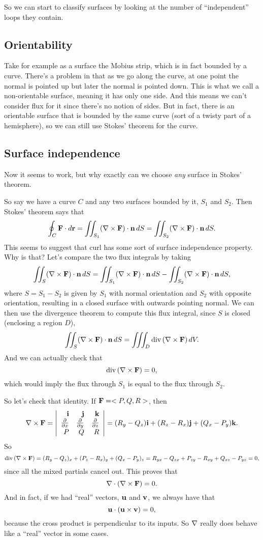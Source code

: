 So we can start to classify surfaces by looking at the number of ``independent'' loops they contain.

\subsection{Orientability}

Take for example as a surface the Mobius strip, which is in fact bounded by a curve. There's a problem in that as we go along the curve, at one point the normal is pointed up but later the normal is pointed down. This is what we call a non-orientable surface, meaning it has only one side. And this means we can't consider flux for it since there's no notion of sides. But in fact, there is an orientable surface that is bounded by the same curve (sort of a twisty part of a hemisphere), so we can still use Stokes' theorem for the curve.

\subsection{Surface independence}
Now it seems to work, but why exactly can we choose \textit{any} surface in Stokes' theorem. 

So say we have a curve $C$ and any two surfaces bounded by it, $S_1$ and $S_2$. Then Stokes' theorem says that
\[ \oint_C \boldsymbol{\mathbf{F}} \cdot d\boldsymbol{\mathbf{r}} = \iint_{S_1} (\nabla \times \boldsymbol{\mathbf{F}}) \cdot \boldsymbol{\mathbf{n}} \, dS = \iint_{S_2} (\nabla \times \boldsymbol{\mathbf{F}}) \cdot \boldsymbol{\mathbf{n}} \, dS.\]
This seems to suggest that curl has some sort of surface independence property. Why is that? Let's compare the two flux integrals by taking
\[ \iint_{S} (\nabla \times \boldsymbol{\mathbf{F}}) \cdot \boldsymbol{\mathbf{n}} \,dS= \iint_{S_1} (\nabla \times \boldsymbol{\mathbf{F}}) \cdot \boldsymbol{\mathbf{n}} \, dS - \iint_{S_2} (\nabla \times \boldsymbol{\mathbf{F}}) \cdot \boldsymbol{\mathbf{n}} \, dS, \]
where $S = S_1 - S_2$ is given by $S_1$ with normal orientation and $S_2$ with opposite orientation, resulting in a closed surface with outwards pointing normal. We can then use the divergence theorem to compute this flux integral, since $S$ is closed (enclosing a region $D$),
\[  \iint_{S} (\nabla \times \boldsymbol{\mathbf{F}}) \cdot \boldsymbol{\mathbf{n}} \, dS = \iiint_D \mathrm{div}\,(\nabla \times \boldsymbol{\mathbf{F}}) \, dV. \]
And we can actually check that
\[ \mathrm{div}\,(\nabla \times \boldsymbol{\mathbf{F}}) = 0, \]
which would imply the flux through $S_1$ is equal to the flux through $S_2$.

So let's check that identity. If $\boldsymbol{\mathbf{F}} = <P,Q,R>$, then
\[ \nabla \times \boldsymbol{\mathbf{F}} = \left| \begin{array}{rrrrrrrrrrrrrrrrrrrrrrrrr} \boldsymbol{\mathbf{i}} & \boldsymbol{\mathbf{j}} & \boldsymbol{\mathbf{k}} \\ \frac{\partial }{\partial x} & \frac{\partial }{\partial y} & \frac{\partial }{\partial z} \\ P & Q & R\\ \end{array} \right| = (R_y-Q_z)\boldsymbol{\mathbf{i}} + (R_z-R_x)\boldsymbol{\mathbf{j}} +(Q_x-P_y)\boldsymbol{\mathbf{k}}. \]
So 
\[ \mathrm{div}\,(\nabla \times \boldsymbol{\mathbf{F}}) = (R_y-Q_z)_x + (P_z-R_x)_y + (Q_x - P_y)_z = R_{yx} - Q_{zx} + P_{zy} - R_{xy} + Q_{xz} - P_{yz} = 0, \]
since all the mixed partials cancel out. This proves that
\[ \nabla \cdot (\nabla \times \boldsymbol{\mathbf{F}}) = 0. \]
And in fact, if we had ``real'' vectors, $\boldsymbol{\mathbf{u}}$ and $\boldsymbol{\mathbf{v}}$, we always have that
\[ \boldsymbol{\mathbf{u}} \cdot (\boldsymbol{\mathbf{u}} \times \boldsymbol{\mathbf{v}}) = 0, \]
because the cross product is perpendicular to its inputs. So $\nabla$ really does behave like a ``real'' vector in some cases. 